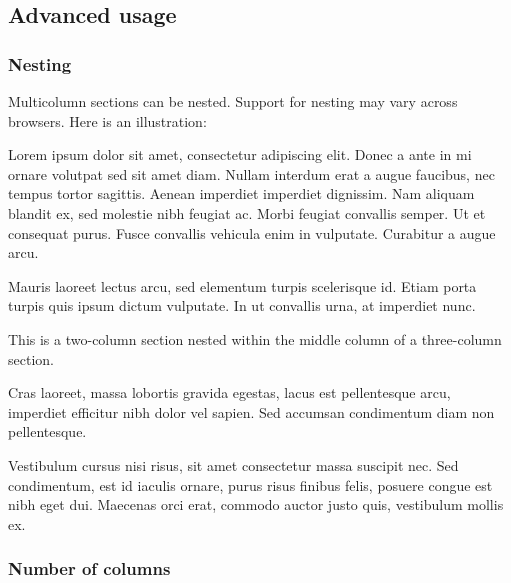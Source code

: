 \documentclass[
]{article}
\begin{document}
\hypertarget{advanced-usage}{%
\subsection{Advanced usage}\label{advanced-usage}}

\hypertarget{nesting}{%
\subsubsection{Nesting}\label{nesting}}

Multicolumn sections can be nested. Support for nesting may vary across
browsers. Here is an illustration:

{\raggedcolumns\begin{multicols}{3}

Lorem ipsum dolor sit amet, consectetur adipiscing elit. Donec a ante in
mi ornare volutpat sed sit amet diam. Nullam interdum erat a augue
faucibus, nec tempus tortor sagittis. Aenean imperdiet imperdiet
dignissim. Nam aliquam blandit ex, sed molestie nibh feugiat ac. Morbi
feugiat convallis semper. Ut et consequat purus. Fusce convallis
vehicula enim in vulputate. Curabitur a augue arcu.

\columnbreak

Mauris laoreet lectus arcu, sed elementum turpis scelerisque id. Etiam
porta turpis quis ipsum dictum vulputate. In ut convallis urna, at
imperdiet nunc.

{\raggedcolumns\begin{multicols}{2}

This is a two-column section nested within the middle column of a
three-column section.

\end{multicols}
}

Cras laoreet, massa lobortis gravida egestas, lacus est pellentesque
arcu, imperdiet efficitur nibh dolor vel sapien. Sed accumsan
condimentum diam non pellentesque.

\columnbreak

Vestibulum cursus nisi risus, sit amet consectetur massa suscipit nec.
Sed condimentum, est id iaculis ornare, purus risus finibus felis,
posuere congue est nibh eget dui. Maecenas orci erat, commodo auctor
justo quis, vestibulum mollis ex.

\end{multicols}
}

\hypertarget{number-of-columns}{%
\subsubsection{Number of columns}\label{number-of-columns}}
\end{document}
